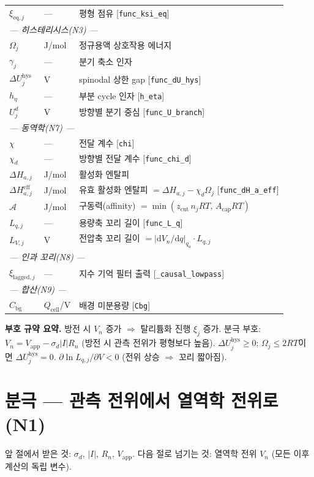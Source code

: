 \documentclass[11pt,a4paper]{article}
\newcommand{\dd}{\mathrm{d}}
\newcommand{\eff}{\mathrm{eff}}
\newcommand{\eq}{\mathrm{eq}}
\newcommand{\app}{\mathrm{app}}
\newcommand{\cell}{\mathrm{cell}}
\newcommand{\bg}{\mathrm{bg}}
\newcommand{\hys}{\mathrm{hys}}
\begin{document}
\begin{longtable}{p{} p{} p{}}
$\xi_{\eq,j}$ & --- & 평형 점유 [\texttt{func\_ksi\_eq}] \\
\multicolumn{3}{l}{\emph{--- 히스테리시스(N3) ---}}\\
$\Omega_j$ & J/mol & 정규용액 상호작용 에너지 \\
$\gamma_j$ & --- & 분기 축소 인자 \\
$\Delta U_j^\hys$ & V & spinodal 상한 gap [\texttt{func\_dU\_hys}] \\
$h_\eta$ & --- & 부분 cycle 인자 [\texttt{h\_eta}] \\
$U_j^d$ & V & 방향별 분기 중심 [\texttt{func\_U\_branch}] \\
\multicolumn{3}{l}{\emph{--- 동역학(N7) ---}}\\
$\chi$ & --- & 전달 계수 [\texttt{chi}] \\
$\chi_d$ & --- & 방향별 전달 계수 [\texttt{func\_chi\_d}] \\
$\Delta H_{a,j}$ & J/mol & 활성화 엔탈피 \\
$\Delta H_{a,j}^{\eff}$ & J/mol & 유효 활성화 엔탈피 $=\Delta H_{a,j}-\chi_d\Omega_j$ [\texttt{func\_dH\_a\_eff}] \\
$\mathcal{A}$ & J/mol & 구동력(affinity) $=\min(z_{\mathrm{cut}}\,n_j RT,\,A_{\mathrm{cap}}RT)$ \\
$L_{q,j}$ & --- & 용량축 꼬리 길이 [\texttt{func\_L\_q}] \\
$L_{V,j}$ & V & 전압축 꼬리 길이 $=|\dd V_n/\dd q|_{q_a}\cdot L_{q,j}$ \\
\multicolumn{3}{l}{\emph{--- 인과 꼬리(N8) ---}}\\
$\xi_{\mathrm{lagged},j}$ & --- & 지수 기억 필터 출력 [\texttt{\_causal\_lowpass}] \\
\multicolumn{3}{l}{\emph{--- 합산(N9) ---}}\\
$C_\bg$ & $Q_\cell$/V & 배경 미분용량 [\texttt{Cbg}] \\
\bottomrule
\end{longtable}

\textbf{부호 규약 요약.}
방전 시 $V_n$ 증가 $\Rightarrow$ 탈리튬화 진행 $\xi_j$ 증가.
분극 부호: $V_n = V_\app - \sigma_d|I|R_n$ (방전 시 관측 전위가 평형보다 높음).
$\Delta U_j^\hys \ge 0$; $\Omega_j \le 2RT$이면 $\Delta U_j^\hys = 0$.
$\partial\ln L_{q,j}/\partial V < 0$ (전위 상승 $\Rightarrow$ 꼬리 짧아짐).

\section{분극 — 관측 전위에서 열역학 전위로 (N1)}
\label{sec:polar}
앞 절에서 받은 것: $\sigma_d$, $|I|$, $R_n$, $V_\app$.
다음 절로 넘기는 것: 열역학 전위 $V_n$ (모든 이후 계산의 독립 변수).
\end{document}
